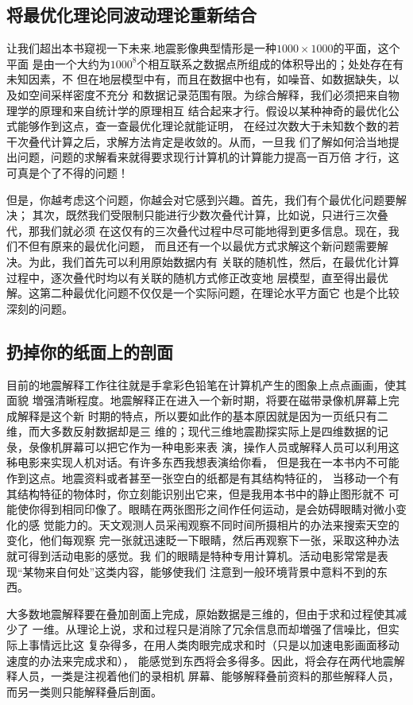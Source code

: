 \subsection{将最优化理论同波动理论重新结合}
\label{sec:5.8.2}

让我们超出本书窥视一下未来.地震影像典型情形是一种$1000\times
1000$的平面，这个平面
是由一个大约为$1000^8$个相互联系之数据点所组成的体积导出的；处处存在有未知因素，不
但在地层模型中有，而且在数据中也有，如噪音、如数据缺失，以及如空间采样密度不充分
和数据记录范围有限。为综合解释，我们必须把来自物理学的原理和来自统计学的原理相互
结合起来才行。假设以某种神奇的最优化公式能够作到这点，查一查最优化理论就能证明，
在经过次数大于未知数个数的若干次叠代计算之后，求解方法肯定是收敛的。从而，一旦我
们了解如何洽当地提出问题，问题的求解看来就得要求现行计算机的计算能力提高一百万倍
才行，这可真是个了不得的问题！

但是，你越考虑这个问题，你越会对它感到兴趣。首先，我们有个最优化问题要解决；
其次，既然我们受限制只能进行少数次叠代计算，比如说，只进行三次叠代，那我们就必须
在这仅有的三次叠代过程中尽可能地得到更多信息。现在，我们不但有原来的最优化问题，
而且还有一个以最优方式求解这个新问题需要解决。为此，我们首先可以利用原始数据内有
关联的随机性，然后，在最优化计算过程中，逐次叠代时均以有关联的随机方式修正改变地
层模型，直至得出最优解。这第二种最优化问题不仅仅是一个实际问题，在理论水平方面它
也是个比较深刻的问题。

\subsection{扔掉你的纸面上的剖面}
\label{sec:5.8.3}

目前的地震解释工作往往就是手拿彩色铅笔在计算机产生的图象上点点画画，使其面貌
増强清晰程度。地震解释正在进入一个新时期，将要在磁带录像机屏幕上完成解释是这个新
时期的特点，所以要如此作的基本原因就是因为一页纸只有二维，而大多数反射数据却是三
维的；现代三维地震勘探实际上是四维数据的记彔，彔像机屏幕可以把它作为一种电影来表
演，操作人员或解释人员可以利用这秭电影来实现人机对话。有许多东西我想表演给你看，
但是我在一本书内不可能作到这点。地震资料或者甚至一张空白的纸都是有其结构特征的，
当移动一个有其结构特征的物体时，你立刻能识别出它来，但是我用本书中的静止图形就不
可能使你得到相同印像了。眼睛在两张图形之间作任何运动，是会妨碍眼睛对微小变化的感
觉能力的。天文观测人员采闱观察不同时间所摄相片的办法来搜索天空的变化，他们每观察
完一张就迅速眨一下眼睛，然后再观察下一张，采取这种办法就可得到活动电影的感觉。我
们的眼睛是特种专用计算机。活动电影常常是表现“某物来自何处”这类内容，能够使我们
注意到一般环境背景中意料不到的东西。

大多数地震解释要在叠加剖面上完成，原始数据是三维的，但由于求和过程使其减少了
一维。从理论上说，求和过程只是消除了冗余信息而却増强了信噪比，但实际上事情远比这
复杂得多，在用人类肉眼完成求和时（只是以加速电影画面移动速度的办法来完成求和），
能感觉到东西将会多得多。因此，将会存在两代地震解释人员，一类是注视着他们的录相机
屏幕、能够解释叠前资料的那些解释人员，而另一类则只能解释叠后剖面。